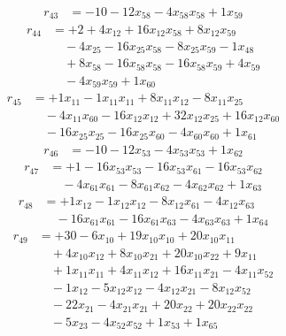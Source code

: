 \[\begin{aligned}
r_{43} &= - 10 - 12 x_{58} - 4 x_{58} x_{58} + 1 x_{59}
\end{aligned}\]
\[\begin{aligned}
r_{44} &= + 2 + 4 x_{12} + 16 x_{12} x_{58} + 8 x_{12} x_{59} \\
 &\quad - 4 x_{25} - 16 x_{25} x_{58} - 8 x_{25} x_{59} - 1 x_{48} \\
 &\quad + 8 x_{58} - 16 x_{58} x_{58} - 16 x_{58} x_{59} + 4 x_{59} \\
 &\quad - 4 x_{59} x_{59} + 1 x_{60}
\end{aligned}\]
\[\begin{aligned}
r_{45} &= + 1 x_{11} - 1 x_{11} x_{11} + 8 x_{11} x_{12} - 8 x_{11} x_{25} \\
 &\quad - 4 x_{11} x_{60} - 16 x_{12} x_{12} + 32 x_{12} x_{25} + 16 x_{12} x_{60} \\
 &\quad - 16 x_{25} x_{25} - 16 x_{25} x_{60} - 4 x_{60} x_{60} + 1 x_{61}
\end{aligned}\]
\[\begin{aligned}
r_{46} &= - 10 - 12 x_{53} - 4 x_{53} x_{53} + 1 x_{62}
\end{aligned}\]
\[\begin{aligned}
r_{47} &= + 1 - 16 x_{53} x_{53} - 16 x_{53} x_{61} - 16 x_{53} x_{62} \\
 &\quad - 4 x_{61} x_{61} - 8 x_{61} x_{62} - 4 x_{62} x_{62} + 1 x_{63}
\end{aligned}\]
\[\begin{aligned}
r_{48} &= + 1 x_{12} - 1 x_{12} x_{12} - 8 x_{12} x_{61} - 4 x_{12} x_{63} \\
 &\quad - 16 x_{61} x_{61} - 16 x_{61} x_{63} - 4 x_{63} x_{63} + 1 x_{64}
\end{aligned}\]
\[\begin{aligned}
r_{49} &= + 30 - 6 x_{10} + 19 x_{10} x_{10} + 20 x_{10} x_{11} \\
 &\quad + 4 x_{10} x_{12} + 8 x_{10} x_{21} + 20 x_{10} x_{22} + 9 x_{11} \\
 &\quad + 1 x_{11} x_{11} + 4 x_{11} x_{12} + 16 x_{11} x_{21} - 4 x_{11} x_{52} \\
 &\quad - 1 x_{12} - 5 x_{12} x_{12} - 4 x_{12} x_{21} - 8 x_{12} x_{52} \\
 &\quad - 22 x_{21} - 4 x_{21} x_{21} + 20 x_{22} + 20 x_{22} x_{22} \\
 &\quad - 5 x_{23} - 4 x_{52} x_{52} + 1 x_{53} + 1 x_{65}
\end{aligned}\]
